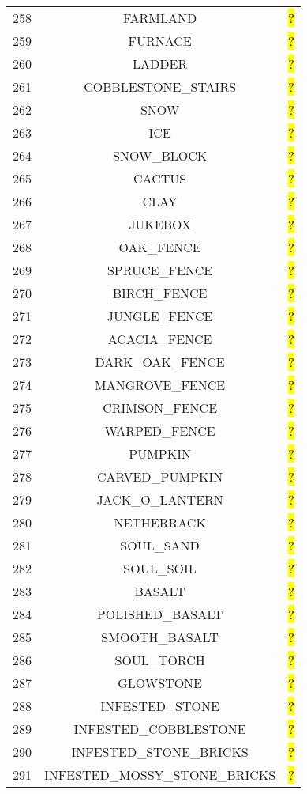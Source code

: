 \documentclass[11pt]{article}
\newcommand\myworries[1]{\sethlcolor{red}\hl{#1}}
\begin{document}
\begin{longtable}{ |c|c|c| }
258 & FARMLAND & \myworries{?} \\
259 & FURNACE & \myworries{?} \\
260 & LADDER & \myworries{?} \\
261 & COBBLESTONE\_STAIRS & \myworries{?} \\
262 & SNOW & \myworries{?} \\
263 & ICE & \myworries{?} \\
264 & SNOW\_BLOCK & \myworries{?} \\
265 & CACTUS & \myworries{?} \\
266 & CLAY & \myworries{?} \\
267 & JUKEBOX & \myworries{?} \\
268 & OAK\_FENCE & \myworries{?} \\
269 & SPRUCE\_FENCE & \myworries{?} \\
270 & BIRCH\_FENCE & \myworries{?} \\
271 & JUNGLE\_FENCE & \myworries{?} \\
272 & ACACIA\_FENCE & \myworries{?} \\
273 & DARK\_OAK\_FENCE & \myworries{?} \\
274 & MANGROVE\_FENCE & \myworries{?} \\
275 & CRIMSON\_FENCE & \myworries{?} \\
276 & WARPED\_FENCE & \myworries{?} \\
277 & PUMPKIN & \myworries{?} \\
278 & CARVED\_PUMPKIN & \myworries{?} \\
279 & JACK\_O\_LANTERN & \myworries{?} \\
280 & NETHERRACK & \myworries{?} \\
281 & SOUL\_SAND & \myworries{?} \\
282 & SOUL\_SOIL & \myworries{?} \\
283 & BASALT & \myworries{?} \\
284 & POLISHED\_BASALT & \myworries{?} \\
285 & SMOOTH\_BASALT & \myworries{?} \\
286 & SOUL\_TORCH & \myworries{?} \\
287 & GLOWSTONE & \myworries{?} \\
288 & INFESTED\_STONE & \myworries{?} \\
289 & INFESTED\_COBBLESTONE & \myworries{?} \\
290 & INFESTED\_STONE\_BRICKS & \myworries{?} \\
291 & INFESTED\_MOSSY\_STONE\_BRICKS & \myworries{?} \\

\end{longtable}
\end{document}
